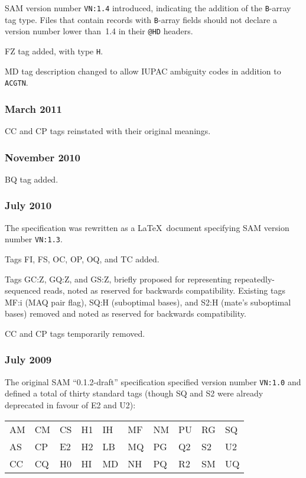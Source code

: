 \documentclass[10pt]{article}
\begin{document}
\begin{appendices}
SAM version number {\tt VN:1.4} introduced, indicating the addition of the {\tt B}-array tag type.
Files that contain records with {\tt B}-array fields should not declare a version number lower than~1.4 in their {\tt @HD} headers.

\gap
FZ tag added, with type {\tt H}.

MD tag description changed to allow IUPAC ambiguity codes in addition to {\tt ACGTN}.

\subsubsection*{March 2011}

CC and CP tags reinstated with their original meanings.

\subsubsection*{November 2010}

BQ tag added.

\subsubsection*{July 2010}

The specification was rewritten as a \LaTeX\ document specifying SAM version number {\tt VN:1.3}.

\gap
Tags FI, FS, OC, OP, OQ, and TC added.

Tags GC:Z, GQ:Z, and GS:Z, briefly proposed for representing repeatedly-sequenced reads, noted as reserved for backwards compatibility.
Existing tags MF:i (MAQ pair flag), SQ:H (suboptimal bases), and S2:H (mate's suboptimal bases) removed and noted as reserved for backwards compatibility.

CC and CP tags temporarily removed.

\subsubsection*{July 2009}

\begin{samepage}
The original SAM ``0.1.2-draft'' specification specified version number {\tt VN:1.0} and defined a total of thirty standard tags (though SQ and S2 were already deprecated in favour of E2 and U2):

\begin{center}
\begin{tabular}{l*{9}{@{\qquad}l}}
AM & CM & CS & H1 & IH & MF & NM & PU & RG & SQ \\
AS & CP & E2 & H2 & LB & MQ & PG & Q2 & S2 & U2 \\
CC & CQ & H0 & HI & MD & NH & PQ & R2 & SM & UQ
\end{tabular}
\end{center}
\end{samepage}

\end{appendices}
\end{document}
